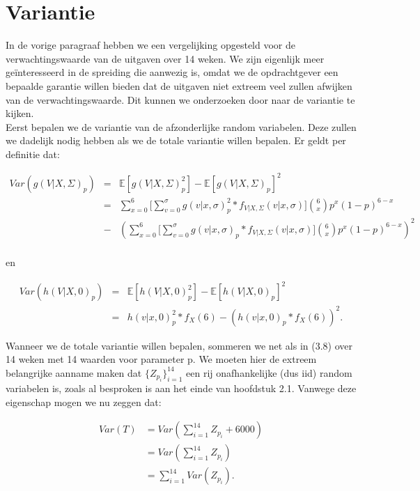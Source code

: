 \section{Variantie}

In de vorige paragraaf hebben we een vergelijking opgesteld voor de verwachtingswaarde van de uitgaven over 14 weken. We zijn eigenlijk meer geïnteresseerd in de spreiding die aanwezig is, omdat we de opdrachtgever een bepaalde garantie willen bieden dat de uitgaven niet extreem veel zullen afwijken van de verwachtingswaarde. Dit kunnen we onderzoeken door naar de variantie te kijken.\\

Eerst bepalen we de variantie van de afzonderlijke random variabelen. Deze zullen we dadelijk nodig hebben als we de totale variantie willen bepalen. Er geldt per definitie dat:

\begin{eqnarray*}
  Var(g(V|X,\Sigma)_{p}) &=& \mathbb{E}[g(V|X,\Sigma)_{p}^{2}] - \mathbb{E}[g(V|X,\Sigma)_{p}]^{2}\\
  &=& \sum_{x=0}^{6} \Bigg[ \sum_{v=0}^{\sigma} g(v|x,\sigma)_{p}^{2} * f_{V|X,\Sigma}(v|x,\sigma) \Bigg] \binom{6}{x} p^{x}(1-p)^{6-x}\\
  &-&  \left( \sum_{x=0}^{6} \Bigg[ \sum_{v=0}^{\sigma} g(v|x,\sigma)_{p} * f_{V|X,\Sigma}(v|x,\sigma) \Bigg] \binom{6}{x} p^{x}(1-p)^{6-x} \right)^{2}\\
\end{eqnarray*}

en 

\begin{eqnarray*}
Var(h(V|X,0)_{p}) &=& \mathbb{E}[h(V|X,0)_{p}^{2}] - \mathbb{E}[h(V|X,0)_{p}]^{2}\\
&=& h(v|x,0)_{p}^{2}*f_{X}(6) - \left( h(v|x,0)_{p}*f_{X}(6)\right)^{2}.
\end{eqnarray*}

Wanneer we de totale variantie willen bepalen, sommeren we net als in (3.8) over 14 weken met 14 waarden voor parameter p. We moeten hier de extreem belangrijke aanname maken dat $\{Z_{p_{i}}\}_{i=1}^{14}$ een rij onafhankelijke (dus iid) random variabelen is, zoals al besproken is aan het einde van hoofdstuk 2.1. Vanwege deze eigenschap mogen we nu zeggen dat:

\begin{equation}
\begin{aligned}
Var(T) &= Var(\sum_{i=1}^{14} Z_{p_{i}} + 6000)\\
&= Var\left( \sum_{i=1}^{14} Z_{p_{i}}\right) \\
&= \sum_{i=1}^{14} Var(Z_{p_{i}}).
\end{aligned}
\end{equation}

